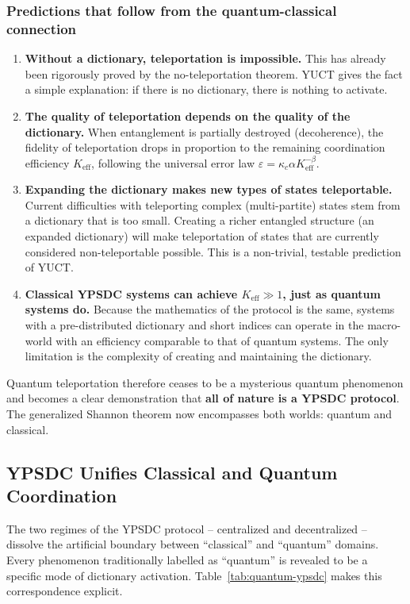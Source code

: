 \documentclass[12pt,a4paper]{article}
\theoremstyle{remark}
\begin{document}
	\subsubsection*{Predictions that follow from the quantum-classical connection}
	
	\begin{enumerate}
		\item \textbf{Without a dictionary, teleportation is impossible.} This has already been rigorously proved by the no-teleportation theorem. YUCT gives the fact a simple explanation: if there is no dictionary, there is nothing to activate.
		\item \textbf{The quality of teleportation depends on the quality of the dictionary.} When entanglement is partially destroyed (decoherence), the fidelity of teleportation drops in proportion to the remaining coordination efficiency \( K_{\mathrm{eff}} \), following the universal error law \( \varepsilon = \kappa_c \alpha K_{\mathrm{eff}}^{-\beta} \).
		\item \textbf{Expanding the dictionary makes new types of states teleportable.} Current difficulties with teleporting complex (multi-partite) states stem from a dictionary that is too small. Creating a richer entangled structure (an expanded dictionary) will make teleportation of states that are currently considered non-teleportable possible. This is a non-trivial, testable prediction of YUCT.
		\item \textbf{Classical YPSDC systems can achieve \( K_{\mathrm{eff}} \gg 1 \), just as quantum systems do.} Because the mathematics of the protocol is the same, systems with a pre-distributed dictionary and short indices can operate in the macro-world with an efficiency comparable to that of quantum systems. The only limitation is the complexity of creating and maintaining the dictionary.
	\end{enumerate}
	
	Quantum teleportation therefore ceases to be a mysterious quantum phenomenon and becomes a clear demonstration that \textbf{all of nature is a YPSDC protocol}. The generalized Shannon theorem now encompasses both worlds: quantum and classical.
	
	\subsection{YPSDC Unifies Classical and Quantum Coordination}
	\label{subsec:unified-table}
	
	The two regimes of the YPSDC protocol -- centralized and decentralized -- dissolve the artificial boundary between ``classical'' and ``quantum'' domains.
	Every phenomenon traditionally labelled as ``quantum'' is revealed to be a specific mode of dictionary activation.
	Table~\ref{tab:quantum-ypsdc} makes this correspondence explicit.
	
\end{document}
